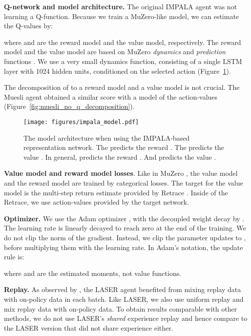 \documentclass{article}
\begin{document}
\textbf{Q-network and model architecture.} The original IMPALA agent was not learning a Q-function. Because we train a MuZero-like model, we can estimate the Q-values by:

where  and  are the reward model and the value model, respectively. The reward model and the value model are based on MuZero \emph{dynamics} and \emph{prediction} functions \cite{schrittwieser2019}. We use a very small dynamics function, consisting of a single LSTM layer with 1024 hidden units, conditioned on the selected action (Figure~\ref{fig:appendix_impala_model}).

The decomposition of  to a reward model and a value model is not crucial. The Muesli agent obtained a similar score with a model of the  action-values (Figure~\ref{fig:muesli_no_q_decomposition}).

\begin{figure}[tb]
\vskip 0.15in
\begin{center}
\centerline{\texttt{[image: figures/impala\_model.pdf]}}
\caption{The model architecture when using the IMPALA-based representation network. The  predicts the reward . The  predicts the value . In general,  predicts the reward . And  predicts the value .
}
\label{fig:appendix_impala_model}
\end{center}
\vskip -0.1in
\end{figure}

\textbf{Value model and reward model losses}. Like in MuZero \citep{schrittwieser2019}, the value model and the reward model are trained by categorical losses. The target for the value model is the multi-step return estimate provided by Retrace \citep{munos2016safe}.
Inside of the Retrace, we use  action-values provided by the target network.

\textbf{Optimizer.} We use the Adam optimizer \citep{kingma2017adam}, with the decoupled weight decay by \cite{adamW2017}. The learning rate is linearly decayed to reach zero at the end of the training. We do not clip the norm of the gradient. Instead, we clip the parameter updates to , before multiplying them with the learning rate. In Adam's notation, the update rule is:

where  and  are the estimated moments, not value functions.

\textbf{Replay.} As observed by \citep{schmitt2020}, the LASER agent benefited from mixing replay data with on-policy data in each batch. Like LASER, we also use uniform replay and mix replay data with on-policy data. To obtain results comparable with other methods, we do not use LASER's \emph{shared} experience replay and hence compare to the LASER version that did not share experience either.
\end{document}
